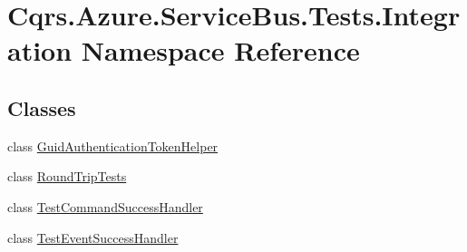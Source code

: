 \hypertarget{namespaceCqrs_1_1Azure_1_1ServiceBus_1_1Tests_1_1Integration}{}\section{Cqrs.\+Azure.\+Service\+Bus.\+Tests.\+Integration Namespace Reference}
\label{namespaceCqrs_1_1Azure_1_1ServiceBus_1_1Tests_1_1Integration}
\subsection*{Classes}
\begin{DoxyCompactItemize}
\item 
class \hyperlink{classCqrs_1_1Azure_1_1ServiceBus_1_1Tests_1_1Integration_1_1GuidAuthenticationTokenHelper}{Guid\+Authentication\+Token\+Helper}
\item 
class \hyperlink{classCqrs_1_1Azure_1_1ServiceBus_1_1Tests_1_1Integration_1_1RoundTripTests}{Round\+Trip\+Tests}
\item 
class \hyperlink{classCqrs_1_1Azure_1_1ServiceBus_1_1Tests_1_1Integration_1_1TestCommandSuccessHandler}{Test\+Command\+Success\+Handler}
\item 
class \hyperlink{classCqrs_1_1Azure_1_1ServiceBus_1_1Tests_1_1Integration_1_1TestEventSuccessHandler}{Test\+Event\+Success\+Handler}
\end{DoxyCompactItemize}

